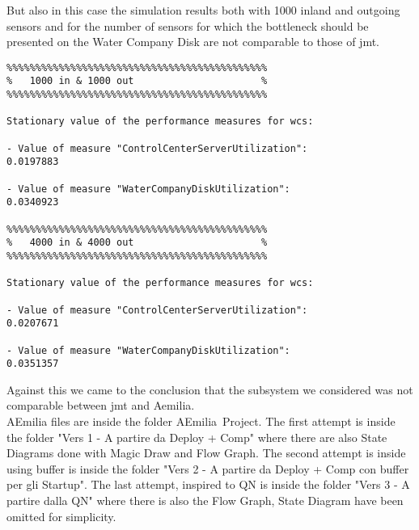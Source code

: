 \begin{center}
\end{center}
\bigskip
{}
\bigskip

But also in this case the simulation results both with 1000 inland and outgoing sensors and for the number of sensors for which the bottleneck should be presented on the Water Company Disk are not comparable to those of jmt.\\

\begin{lstlisting}
%%%%%%%%%%%%%%%%%%%%%%%%%%%%%%%%%%%%%%%%%%%%%
%	1000 in & 1000 out						%
%%%%%%%%%%%%%%%%%%%%%%%%%%%%%%%%%%%%%%%%%%%%%

Stationary value of the performance measures for wcs:

- Value of measure "ControlCenterServerUtilization":
0.0197883

- Value of measure "WaterCompanyDiskUtilization":
0.0340923

%%%%%%%%%%%%%%%%%%%%%%%%%%%%%%%%%%%%%%%%%%%%%
%	4000 in & 4000 out						%
%%%%%%%%%%%%%%%%%%%%%%%%%%%%%%%%%%%%%%%%%%%%%

Stationary value of the performance measures for wcs:

- Value of measure "ControlCenterServerUtilization":
0.0207671

- Value of measure "WaterCompanyDiskUtilization":
0.0351357
\end{lstlisting}


Against this we came to the conclusion that the subsystem we considered was not comparable between jmt and Aemilia.\\

AEmilia files are inside the folder AEmilia\ Project. The first attempt is inside the folder "Vers 1 - A partire da Deploy + Comp" where there are also State Diagrams done with Magic Draw and Flow Graph. The second attempt is inside using buffer is inside the folder "Vers 2 - A partire da Deploy + Comp con buffer per gli Startup". The last attempt, inspired to QN is inside the folder "Vers 3 - A partire dalla QN" where there is also the Flow Graph, State Diagram have been omitted for simplicity.